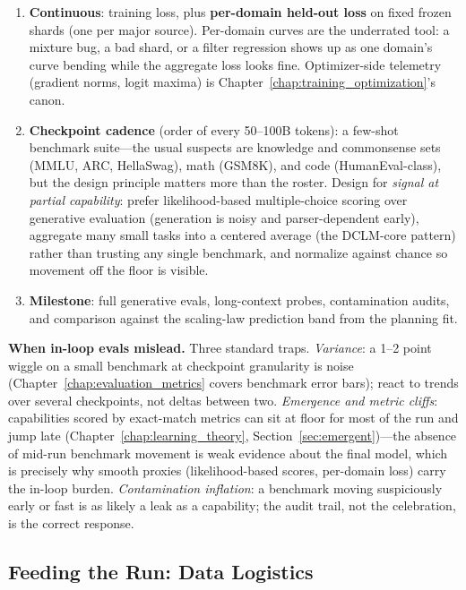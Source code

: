 \begin{enumerate}
    \item \textbf{Continuous}: training loss, plus \textbf{per-domain held-out loss} on fixed frozen shards (one per major source). Per-domain curves are the underrated tool: a mixture bug, a bad shard, or a filter regression shows up as one domain's curve bending while the aggregate loss looks fine. Optimizer-side telemetry (gradient norms, logit maxima) is Chapter~\ref{chap:training_optimization}'s canon.
    \item \textbf{Checkpoint cadence} (order of every 50--100B tokens): a few-shot benchmark suite---the usual suspects are knowledge and commonsense sets (MMLU, ARC, HellaSwag), math (GSM8K), and code (HumanEval-class), but the design principle matters more than the roster. Design for \textit{signal at partial capability}: prefer likelihood-based multiple-choice scoring over generative evaluation (generation is noisy and parser-dependent early), aggregate many small tasks into a centered average (the DCLM-core pattern) rather than trusting any single benchmark, and normalize against chance so movement off the floor is visible.
    \item \textbf{Milestone}: full generative evals, long-context probes, contamination audits, and comparison against the scaling-law prediction band from the planning fit.
\end{enumerate}

\textbf{When in-loop evals mislead.} Three standard traps. \textit{Variance}: a 1--2 point wiggle on a small benchmark at checkpoint granularity is noise (Chapter~\ref{chap:evaluation_metrics} covers benchmark error bars); react to trends over several checkpoints, not deltas between two. \textit{Emergence and metric cliffs}: capabilities scored by exact-match metrics can sit at floor for most of the run and jump late (Chapter~\ref{chap:learning_theory}, Section~\ref{sec:emergent})---the absence of mid-run benchmark movement is weak evidence about the final model, which is precisely why smooth proxies (likelihood-based scores, per-domain loss) carry the in-loop burden. \textit{Contamination inflation}: a benchmark moving suspiciously early or fast is as likely a leak as a capability; the audit trail, not the celebration, is the correct response.

\subsection{Feeding the Run: Data Logistics}

